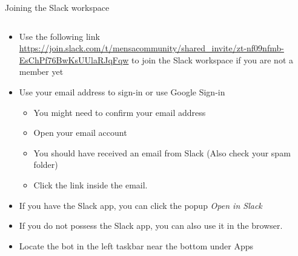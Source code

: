 \begin{frame}{Joining the Slack workspace}
  \begin{columns}
    \begin{column}[]{0.7\textwidth}
      \begin{itemize}
        \item Use the following link \\
         \url{https://join.slack.com/t/mensacommunity/shared_invite/zt-nf09nfmb-EsChPf76BwKsUUlaRJqFqw} to join the Slack workspace if you are not a member yet
        \item Use your email address to sign-in or use Google Sign-in
         \begin{itemize}
          \item You might need to confirm your email address
          \item Open your email account
          \item You should have received an email from Slack (Also check your spam folder)
          \item  Click the link inside the email. 
        \end{itemize}
       \item If you have the Slack app, you can click the popup \emph{Open in Slack}
        \item If you do not possess the Slack app, you can also use it in the browser.
        \item  Locate the bot in the left taskbar near the bottom under Apps
      \end{itemize}


\end{column}
\end{columns}
\end{frame}

